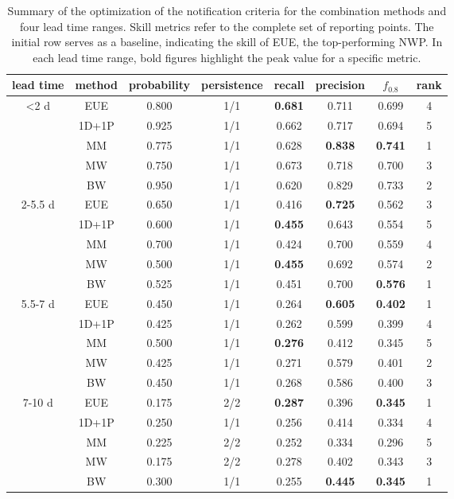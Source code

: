 \documentclass[preprint,12pt]{elsarticle}
\begin{document}
\begin{table}
    \centering
    \caption{Summary of the optimization of the notification criteria for the combination methods and four lead time ranges. Skill metrics refer to the complete set of reporting points. The initial row serves as a baseline, indicating the skill of EUE, the top-performing NWP. In each lead time range, bold figures highlight the peak value for a specific metric. }
    \begin{tabular}{cccccccc}
        \toprule
        lead time & method & probability & persistence & recall & precision & $f_{0.8}$ & rank \\
        \midrule
        \textless 2 d& EUE & 0.800 & 1/1 & \textbf{0.681} & 0.711 & 0.699 & 4 \\
         & 1D+1P & 0.925 & 1/1 & 0.662 & 0.717 & 0.694 & 5 \\
         & MM & 0.775 & 1/1 & 0.628 & \textbf{0.838} & \textbf{0.741} & 1 \\
         & MW & 0.750 & 1/1 & 0.673 & 0.718 & 0.700 & 3 \\
         & BW & 0.950 & 1/1 & 0.620 & 0.829 & 0.733 & 2 \\
         \midrule
        2-5.5 d & EUE & 0.650 & 1/1 & 0.416 & \textbf{0.725} & 0.562 & 3 \\
         & 1D+1P & 0.600 & 1/1 & \textbf{0.455} & 0.643 & 0.554 & 5 \\
         & MM & 0.700 & 1/1 & 0.424 & 0.700 & 0.559 & 4 \\
         & MW & 0.500 & 1/1 & \textbf{0.455} & 0.692 & 0.574 & 2 \\
         & BW & 0.525 & 1/1 & 0.451 & 0.700 & \textbf{0.576} & 1 \\
         \midrule
        5.5-7 d & EUE & 0.450 & 1/1 & 0.264 & \textbf{0.605} & \textbf{0.402} & 1 \\
         & 1D+1P & 0.425 & 1/1 & 0.262 & 0.599 & 0.399 & 4 \\
         & MM & 0.500 & 1/1 & \textbf{0.276} & 0.412 & 0.345 & 5 \\
         & MW & 0.425 & 1/1 & 0.271 & 0.579 & 0.401 & 2 \\
         & BW & 0.450 & 1/1 & 0.268 & 0.586 & 0.400 & 3 \\
         \midrule
        7-10 d & EUE & 0.175 & 2/2 & \textbf{0.287} & 0.396 & \textbf{0.345} & 1 \\
         & 1D+1P & 0.250 & 1/1 & 0.256 & 0.414 & 0.334 & 4 \\
         & MM & 0.225 & 2/2 & 0.252 & 0.334 & 0.296 & 5 \\
         & MW & 0.175 & 2/2 & 0.278 & 0.402 & 0.343 & 3 \\
         & BW & 0.300 & 1/1 & 0.255 & \textbf{0.445} & \textbf{0.345} & 1 \\
         \bottomrule
    \end{tabular}
    \label{tab:COMB_optimization}
\end{table}
\end{document}
